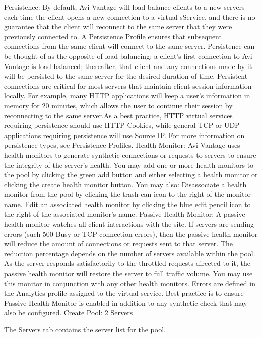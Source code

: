 \documentclass[letterpaper,10pt,english]{sphinxmanual}
\begin{document}
Persistence: By default, Avi Vantage will load balance clients to a new servers each time the client opens a new connection to a virtual sService, and there is no guarantee that the client will reconnect to the same server that they were previously connected to. A Persistence Profile ensures that subsequent connections from the same client will connect to the same server. Persistence can be thought of as the opposite of load balancing: a client's first connection to Avi Vantage is load balanced; thereafter, that client and any connections made by it will be persisted to the same server for the desired duration of time. Persistent connections are critical for most servers that maintain client session information locally. For example, many HTTP applications will keep a user’s information in memory for 20 minutes, which allows the user to continue their session by reconnecting to the same server.As a best practice, HTTP virtual services requiring persistence should use HTTP Cookies, while general TCP or UDP applications requiring persistence will use Source IP. For more information on persistence types, see Persistence Profiles.
Health Monitor: Avi Vantage uses health monitors to generate synthetic connections or requests to servers to ensure the integrity of the server’s health. You may add one or more health monitors to the pool by clicking the green add button and either selecting a health monitor or clicking the create health monitor button. You may also:
Disassociate a health monitor from the pool by clicking the trash can icon to the right of the monitor name.
Edit an associated health monitor by clicking the blue edit pencil icon to the right of the associated monitor’s name.
Passive Health Monitor: A passive health monitor watches all client interactions with the site. If servers are sending errors (such 500 Busy or TCP connection errors), then the passive health monitor will reduce the amount of connections or requests sent to that server. The reduction percentage depends on the number of servers available within the pool. As the server responds satisfactorily to the throttled requests directed to it, the passive health monitor will restore the server to full traffic volume. You may use this monitor in conjunction with any other health monitors. Errors are defined in the Analytics profile assigned to the virtual service. Best practice is to ensure Passive Health Monitor is enabled in addition to any synthetic check that may also be configured.
Create Pool: 2 Servers

The Servers tab contains the server list for the pool.
\end{document}
